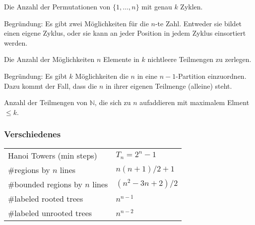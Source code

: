 \begin{bem}\label{bem:stirling1}
Die Anzahl der Permutationen von $\{1, \ldots, n\}$ mit genau $k$ Zyklen.

Begründung: Es gibt zwei Möglichkeiten für die $n$-te Zahl. Entweder sie bildet einen eigene Zyklus, oder sie kann an jeder Position in jedem Zyklus einsortiert werden.
\end{bem}

\begin{bem}\label{bem:stirling2}
Die Anzahl der Möglichkeiten $n$ Elemente in $k$ nichtleere Teilmengen zu zerlegen.

Begründung: Es gibt $k$ Möglichkeiten die $n$ in eine $n-1$-Partition einzuordnen. Dazu kommt der Fall, dass die $n$ in ihrer eigenen Teilmenge (alleine) steht.
\end{bem}

\begin{bem}\label{bem:integerPartitions}
Anzahl der Teilmengen von $\mathbb{N}$, die sich zu $n$ aufaddieren mit maximalem Elment $\leq k$.
\end{bem}

\subsubsection{Verschiedenes}
\begin{tabular}{|l|l|}
	\hline
	Hanoi Towers (min steps)		& $T_n = 2^n - 1$\\
	\#regions by $n$ lines			& $n\left(n + 1\right) / 2 + 1$\\
	\#bounded regions by $n$ lines		& $\left(n^2 - 3n + 2\right) / 2$\\
	\#labeled rooted trees			& $n^{n-1}$\\
	\#labeled unrooted trees			& $n^{n-2}$\\
	\hline
\end{tabular}